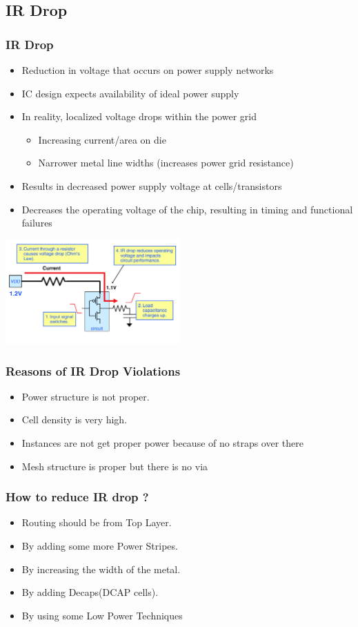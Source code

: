 \documentclass[compress]{beamer}
\begin{document}
	\subsection[IR Drop]{IR Drop}
	\begin{frame}
		\frametitle{IR Drop}
		\begin{itemize}
			\item Reduction in voltage that occurs on power supply networks
			\item IC design expects availability of ideal power supply
			\item In reality, localized voltage drops within the power grid
		\begin{itemize}
			\item Increasing current/area on die
			\item Narrower metal line widths (increases power grid resistance)
		\end{itemize}
			\item Results in decreased power supply voltage at cells/transistors
			\item Decreases the operating voltage of the chip, resulting in timing and functional failures
		\end{itemize}
	\begin{center}
		\includegraphics[width=0.5\textwidth]{IR4}
	\end{center}
	\end{frame}
\begin{frame}
	\frametitle{Reasons of IR Drop Violations}
	\begin{itemize}
		\item Power structure is not proper.
		\item Cell density is very high.
		\item Instances are not get proper power because of no straps
		over there
		\item Mesh structure is proper but there is no via
	\end{itemize}
\end{frame}
\begin{frame}
	\frametitle{How to reduce IR drop ?}
	\begin{itemize}
		\item Routing should be from Top Layer.
		\item By adding some more Power Stripes.
		\item By increasing the width of the metal.
		\item By adding Decaps(DCAP cells).
		\item By using some Low Power Techniques
	\end{itemize}
\end{frame}
\end{document}
